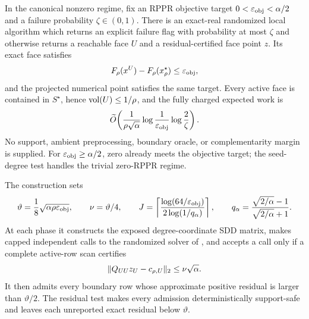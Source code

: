 \begin{theorem}
\label{thm:two-stage-threshold-source}
In the canonical nonzero regime, fix an RPPR objective target
$0<\varepsilon_{\rm obj}<\alpha/2$ and a
failure probability $\zeta\in(0,1)$.  There is an exact-real randomized local
algorithm which returns an explicit failure flag with probability at most
$\zeta$ and otherwise returns a reachable face $U$ and a residual-certified
face point $z$.  Its exact face satisfies
\begin{equation}
 F_\rho(x^U)-F_\rho(x_\rho^\star)\leq\varepsilon_{\rm obj},
 \label{eq:two-stage-threshold-face-gap}
\end{equation}
and the projected numerical point satisfies the same target.  Every active
face is contained in $S^\star$, hence
$\operatorname{vol}(U)\leq1/\rho$, and the fully charged expected work is
\begin{equation}
 \widetilde O\!\left(
   \frac{1}{\rho\sqrt\alpha}
   \log\frac1{\varepsilon_{\rm obj}}
   \log\frac2\zeta
 \right).
 \label{eq:two-stage-threshold-source-work}
\end{equation}
No support, ambient preprocessing, boundary oracle, or complementarity
margin is supplied.
For $\varepsilon_{\rm obj}\geq\alpha/2$, zero already meets the objective
target; the seed-degree test handles the trivial zero-RPPR regime.
\end{theorem}

The construction sets
\begin{equation}
 \vartheta=\frac18\sqrt{\alpha\rho\varepsilon_{\rm obj}},
 \qquad \nu=\vartheta/4,
 \qquad
 J=\left\lceil
  \frac{\log(64/\varepsilon_{\rm obj})}
       {2\log(1/q_\alpha)}
 \right\rceil,
 \qquad
 q_\alpha=\frac{\sqrt{2/\alpha}-1}{\sqrt{2/\alpha}+1}.
 \label{eq:two-stage-threshold-parameters}
\end{equation}
At each phase it constructs the exposed degree-coordinate SDD matrix, makes
capped independent calls to the randomized solver of
\citet{koutis2011nearly}, and accepts a call only if a complete active-row
scan certifies
\begin{equation}
 \lVert Q_{UU}z_U-c_{\rho,U}\rVert_2\leq\nu\sqrt\alpha.
 \label{eq:two-stage-threshold-residual-test}
\end{equation}
It then admits every boundary row whose approximate positive residual is
larger than $\vartheta/2$.  The residual test makes every admission
deterministically support-safe and leaves each unreported exact residual
below $\vartheta$.

